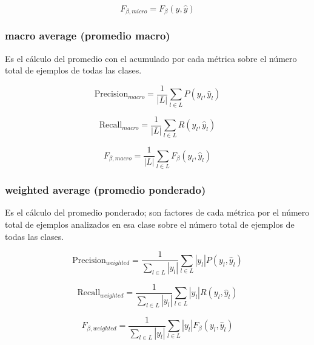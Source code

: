 \begin{equation}
F_{\beta, micro} = F_{\beta}(y, \hat{y})
\end{equation}

\subsubsection{macro average (promedio macro)}

Es el cálculo del promedio con el acumulado por cada métrica sobre el número total de ejemplos de todas las clases.

\begin{equation}
\text{Precision}_{macro} = \frac{1}{|L|} \sum_{l \in L} P(y_l, \hat{y}_l)
\end{equation}

\begin{equation}
\text{Recall}_{macro} = \frac{1}{|L|} \sum_{l \in L} R(y_l, \hat{y}_l)
\end{equation}

\begin{equation}
F_{\beta, macro} = \frac{1}{|L|} \sum_{l \in L} F_{\beta}(y_l, \hat{y}_l)
\end{equation}

\subsubsection{weighted average (promedio ponderado)}

Es el cálculo del promedio ponderado; son factores de cada métrica por el número total de ejemplos analizados en esa clase sobre el número total de ejemplos de todas las clases.

\begin{equation}
\text{Precision}_{weighted} = \frac{1}{\sum_{l \in L} |y_l|} \sum_{l \in L} |y_l| P(y_l, \hat{y}_l)
\end{equation}

\begin{equation}
\text{Recall}_{weighted} = \frac{1}{\sum_{l \in L} |y_l|} \sum_{l \in L} |y_l| R(y_l, \hat{y}_l)
\end{equation}

\begin{equation}
F_{\beta, weighted} = \frac{1}{\sum_{l \in L} |y_l|} \sum_{l \in L} |y_l| F_{\beta}(y_l, \hat{y}_l)
\end{equation}

\cite{classificationMetricsSkLearn}
\cite{classificationReportSkLearn}

